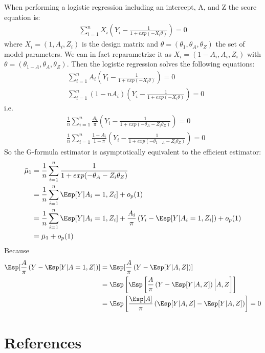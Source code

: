 \documentclass[12pt]{article}
\begin{document}
When performing a logistic regression including an intercept, A, and Z
the score equation is:
\begin{align*}
\sum_{i=1}^n X_i \left(Y_i - \frac{1}{1+exp(-X_i \theta)}\right) = 0
\end{align*}
where \(X_i = (1,A_i,Z_i)\) is the design matrix and
\(\theta=(\theta_1,\theta_A,\theta_Z)\) the set of model
parameters. We can in fact reparametrize it as \(X_i =
(1-A_i,A_i,Z_i)\) with
\(\theta=(\theta_{1-A},\theta_A,\theta_Z)\). Then the logistic
regression solves the following equations:
\begin{align*}
&\sum_{i=1}^n A_i \left(Y_i - \frac{1}{1+exp(-X_i \theta)}\right) = 0 \\
&\sum_{i=1}^n (1-n A_i) \left(Y_i - \frac{1}{1+exp(-X_i \theta)}\right) = 0
\end{align*}
i.e.
\begin{align*}
&\frac{1}{n} \sum_{i=1}^n \frac{A_i}{\pi} \left(Y_i - \frac{1}{1+exp(-\theta_{A}-Z_i \theta_Z)}\right) = 0 \\
&\frac{1}{n}  \sum_{i=1}^n \frac{1 - A_i}{1-\pi} \left(Y_i - \frac{1}{1+exp(-\theta_{1-A}-Z_i \theta_Z)}\right) = 0
\end{align*}
So the G-formula estimator is asymptotically equivalent to the efficient estimator:
\begin{align*}
\bar{\mu}_1 &= \frac{1}{n} \sum_{i=1}^n \frac{1}{1+exp(-\theta_{A}-Z_i \theta_Z)} \\
            &= \frac{1}{n} \sum_{i=1}^n \Esp[Y|A_i=1,Z_i] + o_p(1) \\
            &= \frac{1}{n} \sum_{i=1}^n \Esp[Y|A_i=1,Z_i] + \frac{A_i}{\pi}\left(Y_i - \Esp[Y|A_i=1,Z_i]\right) + o_p(1) \\
            &= \tilde{\mu}_1 + o_p(1)
\end{align*}
Because
\begin{align*}
\Esp[\frac{A}{\pi}\left(Y - \Esp[Y|A=1,Z]\right)] &= \Esp[\frac{A}{\pi}\left(Y - \Esp[Y|A,Z]\right)] \\
&= \Esp\left[\Esp\left[\frac{A}{\pi}\left(Y - \Esp[Y|A,Z]\right)\Big|A,Z\right]\right] \\
&= \Esp\left[\frac{\Esp[A]}{\pi}\left(\Esp[Y|A,Z] - \Esp[Y|A,Z]\right)\right] = 0
\end{align*}

\section{References}
\label{sec:org22dbe02}
\begingroup
\renewcommand{\section}[2]{}



\endgroup
\end{document}
